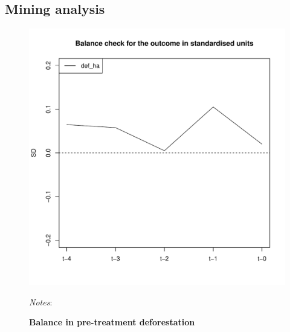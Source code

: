 \documentclass[12pt,reqno]{article}
\begin{document}
\pagebreak
\subsection{Mining analysis}
\begin{figure}[htbp!]
\begin{center}
\begin{minipage}{1 \linewidth}
  \caption{\textbf{Balance in pre-treatment deforestation}}
  \label{fig:panelmatchbal}	
\centerline{\includegraphics[width=4 in,angle=0]{Output/PanelMatch_bal.pdf}}
\smallskip
\scriptsize
\emph{Notes}: 
\end{minipage}
\end{center}
\end{figure}
\end{document}
